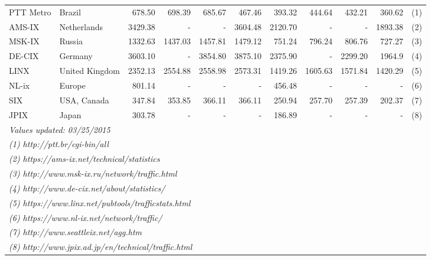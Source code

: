 \documentclass{sig-alternate}
\begin{document}
\begin{table}[t]
\begin{tabular}{l|l| r r r r |r r r r| l}
PTT Metro	& Brazil			&678.50		&698.39		&685.67		&467.46		&393.32		&444.64		&432.21		&360.62 	&(1)\\
AMS-IX		& Netherlands		&3429.38	&-			&-			&3604.48	&2120.70	&-			&-			&1893.38   &(2)\\
MSK-IX		& Russia			&1332.63	&1437.03	&1457.81	&1479.12	&751.24		&796.24		&806.76		&727.27	&(3)\\
DE-CIX		& Germany			&3603.10	&-			&3854.80	&3875.10 	&2375.90	&-			&2299.20	&1964.9  	&(4)\\
LINX		& United Kingdom	&2352.13	&2554.88	&2558.98	&2573.31	&1419.26	&1605.63	&1571.84	&1420.29   &(5)\\
NL-ix  		& Europe			&801.14		&-			&-			&-			&456.48		&-			&-  		&-	&(6)\\                                                                        
SIX  		& USA, Canada		&347.84		&353.85		&366.11		&366.11		&250.94		&257.70		&257.39		&202.37  	&(7)\\                                                                        
JPIX  		& Japan				&303.78		&-			&-			&-			&186.89		&-			&-			&- 	&(8)\\                                                                        
\hline       
\multicolumn{11}{l}{\textit{Values updated: 03/25/2015}}\\         
\multicolumn{3}{l}{\textit{(1) http://ptt.br/cgi-bin/all}}\\                           
\multicolumn{11}{l}{\textit{(2) https://ams-ix.net/technical/statistics}}\\                           
\multicolumn{11}{l}{\textit{(3) http://www.msk-ix.ru/network/traffic.html}}\\                           
\multicolumn{11}{l}{\textit{(4) http://www.de-cix.net/about/statistics/}}\\                           
\multicolumn{11}{l}{\textit{(5) https://www.linx.net/pubtools/trafficstats.html}}\\                           
\multicolumn{11}{l}{\textit{(6) https://www.nl-ix.net/network/traffic/}}\\                           
\multicolumn{11}{l}{\textit{(7) http://www.seattleix.net/agg.htm}}\\                  
\multicolumn{11}{l}{\textit{(8) http://www.jpix.ad.jp/en/technical/traffic.html}}                  
\end{tabular}
\label{tab:Traffic2}                               
\end{table}
\end{document}
